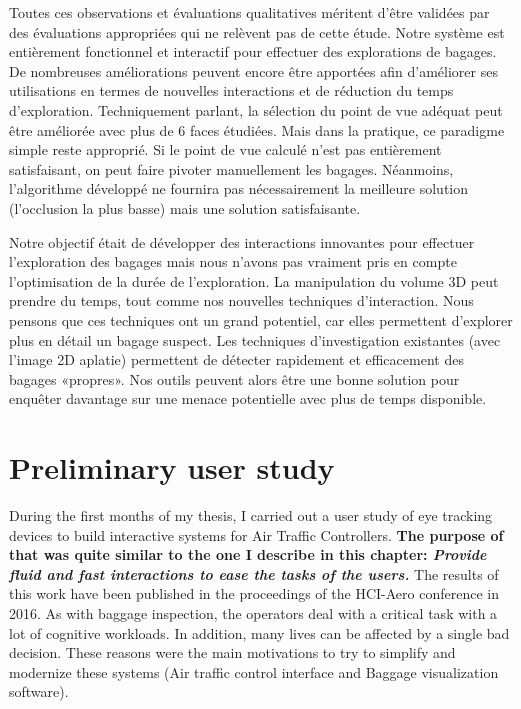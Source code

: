 Toutes ces observations et évaluations qualitatives méritent d'être validées par des évaluations appropriées qui ne relèvent pas de cette étude.
Notre système est entièrement fonctionnel et interactif pour effectuer des explorations de bagages. De nombreuses améliorations peuvent encore être apportées afin d'améliorer ses utilisations en termes de nouvelles interactions et de réduction du temps d'exploration.
Techniquement parlant, la sélection du point de vue adéquat peut être améliorée avec plus de 6 faces étudiées. Mais dans la pratique, ce paradigme simple reste approprié. Si le point de vue calculé n'est pas entièrement satisfaisant, on peut faire pivoter manuellement les bagages. Néanmoins, l'algorithme développé ne fournira pas nécessairement la meilleure solution (l'occlusion la plus basse) mais une solution satisfaisante.
\par Notre objectif était de développer des interactions innovantes pour effectuer l'exploration des bagages mais nous n'avons pas vraiment pris en compte l'optimisation de la durée de l'exploration. La manipulation du volume 3D peut prendre du temps, tout comme nos nouvelles techniques d'interaction. Nous pensons que ces techniques ont un grand potentiel, car elles permettent d’explorer plus en détail un bagage suspect. Les techniques d'investigation existantes (avec l'image 2D aplatie) permettent de détecter rapidement et efficacement des bagages «propres». Nos outils peuvent alors être une bonne solution pour enquêter davantage sur une menace potentielle avec plus de temps disponible.


\NewPage

\section{ Preliminary user study }
During the first months of my thesis, I carried out a user study of eye tracking devices to build interactive systems for Air Traffic Controllers. \textbf{ The purpose of that was quite similar to the one I describe in this chapter: \textit{Provide fluid and fast interactions to ease the tasks of the users.} } The results of this work have been published in the proceedings of the HCI-Aero conference in 2016. As with baggage inspection, the operators deal with a critical task with a lot of cognitive workloads. In addition, many lives can be affected by a single bad decision. These reasons were the main motivations to try to simplify and modernize these systems (Air traffic control interface and Baggage visualization software). 


